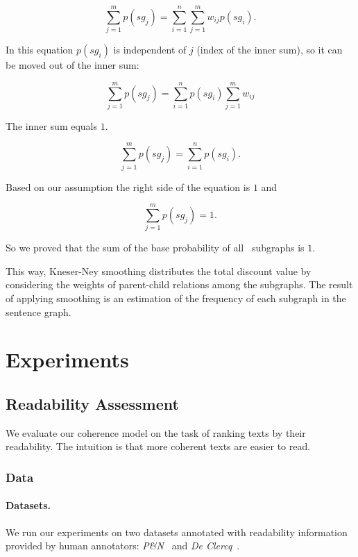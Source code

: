 \begin{equation*}
\sum_{j=1}^m p(sg_j) = \sum_{i=1}^n \sum_{j=1}^m w_{ij}p(sg_i).
\end{equation*}

\noindent
In this equation $p(sg_i)$ is independent of $j$ (index of the inner
sum), so it can be moved out of the inner sum:

\begin{equation*}
\sum_{j=1}^m p(sg_j) = \sum_{i=1}^n p(sg_i) \sum_{j=1}^m w_{ij}
\end{equation*}

\noindent
The inner sum equals $1$.

\begin{equation*}
\sum_{j=1}^m p(sg_j) = \sum_{i=1}^n p(sg_i).
\end{equation*}

\noindent
Based on our assumption the right side of the equation is $1$ and 

\begin{equation*}
\sum_{j=1}^m p(sg_j) = 1.
\end{equation*}

\noindent
So we proved that the sum of the base probability of all \knode\
subgraphs is $1$.\QEDB


This way, Kneser-Ney smoothing distributes the total discount value by
considering the weights of parent-child relations among the
subgraphs. The result of applying smoothing is an estimation of the
frequency of each subgraph in the sentence graph.



\section{Experiments}
\label{sec:experiments}


\subsection{Readability Assessment}
\label{subsec:readability_assessment}
We evaluate our coherence model on the task of ranking texts by their
readability. The intuition is that more coherent texts are easier to
read. 


\subsubsection{Data}
\paragraph{Datasets.} We run our experiments on two datasets annotated
with readability information provided by human annotators: \emph{P\&N}\
\cite{pitler08} and \emph{De Clercq}\ \cite{declercq14}.

